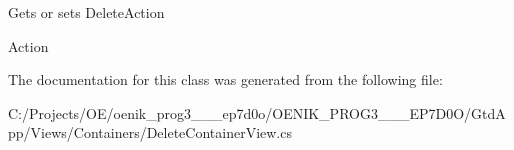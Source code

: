 Gets or sets Delete\+Action 

Action

The documentation for this class was generated from the following file\+:\begin{DoxyCompactItemize}
\item 
C\+:/\+Projects/\+O\+E/oenik\+\_\+prog3\+\_\+\_\+\_\+ep7d0o/\+O\+E\+N\+I\+K\+\_\+\+P\+R\+O\+G3\+\_\+\_\+\_\+\+E\+P7\+D0\+O/\+Gtd\+App/\+Views/\+Containers/Delete\+Container\+View.\+cs\end{DoxyCompactItemize}
